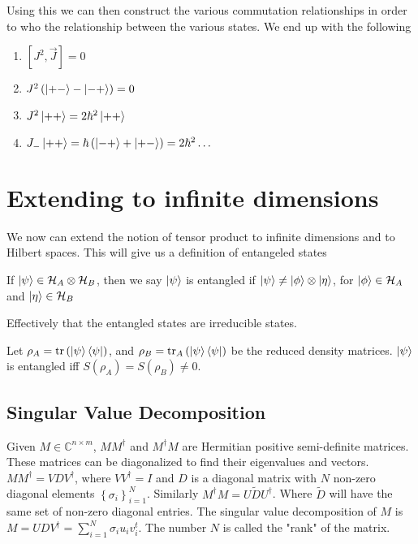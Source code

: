 Using this we can then construct the various commutation relationships
in order to who the relationship between the various states. We end up
with the following
\begin{enumerate}
    \item $\left[J^2, \vec{J}\right] = 0$
    \item $J^2 \left(\Ket{+-} - \Ket{-+}\right) = 0$
    \item $J^2 \Ket{++} = 2 \hbar^2 \Ket{++}$
    \item $J_- \Ket{++} = \hbar \left(\Ket{-+} + \Ket{+-}\right) = 2\hbar^2 \dots$
\end{enumerate}

\section{Extending to infinite dimensions}
We now can extend the notion of tensor product to infinite dimensions
and to Hilbert spaces. This will give us a definition of entangeled states
\begin{definition}
\label{entangledState}
If $\Ket{\psi} \in \mathcal{H}_A \otimes \mathcal{H}_B$, then we say
$\Ket{\psi}$ is entangled if $\Ket{\psi} \ne \Ket{\phi} \otimes \Ket{\eta}$,
for $\Ket{\phi} \in \mathcal{H}_A$ and $\Ket{\eta} \in \mathcal{H}_B$
\end{definition}
Effectively that the entangled states are irreducible states.

\begin{theorem}
\label{redDensityMatrix}
Let $\rho_A = \operatorname{tr} \left(\Ket{\psi}\Bra{\psi}\right)$, and
$\rho_B = \operatorname{tr}_A \left(\Ket{\psi}\Bra{\psi}\right)$ be the reduced density matrices.
$\Ket{\psi}$ is entangled iff $S(\rho_A) = S(\rho_B) \ne 0$.
\end{theorem}

\subsection{Singular Value Decomposition}
Given $M \in \mathbb{C}^{n \times m}$, $MM^\dagger$ and $M^\dagger M$ are
Hermitian positive semi-definite matrices. These matrices can be diagonalized
to find their eigenvalues and vectors.
$MM^\dagger = V D V^\dagger$, where $VV^\dagger = I$ and $D$ is a diagonal
matrix with $N$ non-zero diagonal elements $\left\{\sigma_i\right\}_{i=1}^{N}$.
Similarly $M^\dagger M = U \tilde{D} U^\dagger$. Where $\tilde{D}$ will have the same
set of non-zero diagonal entries. The singular value decomposition of $M$ is
$M = U D V^\dagger = \sum_{i = 1}^{N} \sigma_i u_i v_i^t$. The number $N$ is called
the "rank" of the matrix.

